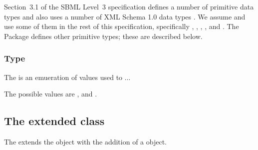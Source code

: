 Section~3.1 of the SBML Level~3 specification defines a number of
primitive data types and also uses a number of XML Schema 1.0 data types
\citep{biron:2000}. We assume and use some of them in the rest of this
specification, specifically , ,
, , and . The \Groups
Package defines other primitive types; these are described below.


\subsubsection{Type \fixttspace{}}



The  is an emueration of values used to ...

The possible values are ,  and
.

\subsection{The extended  class}
\label{extended-model-class}




The \GroupsPackage extends the  object with the addition of
a \ListOfGroups object.

